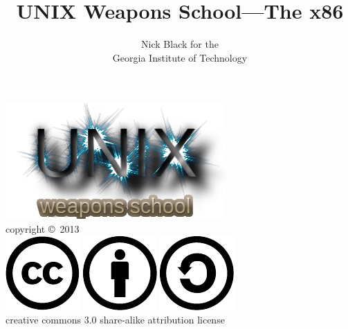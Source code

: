 \documentclass[mathserif,xcolor={dvipsnames,table}]{beamer}
\title{UNIX Weapons School---The x86}
\date{}
\author{Nick Black for the\\
Georgia Institute of Technology
}
\begin{document}
\begin{frame}
\titlepage
\begin{center}
\includegraphics[scale=0.33]{images/uws.png}\\
\vspace{.1in}
\tiny{copyright \copyright\ 2013}\\
\includegraphics[scale=.25]{images/cc-logo.pdf}
\includegraphics[scale=.25]{images/cc-new.pdf}
\includegraphics[scale=.25]{images/cc-share.pdf}\\
\tiny{creative commons 3.0 share-alike attribution license}
\end{center}
\end{frame}
\end{document}
